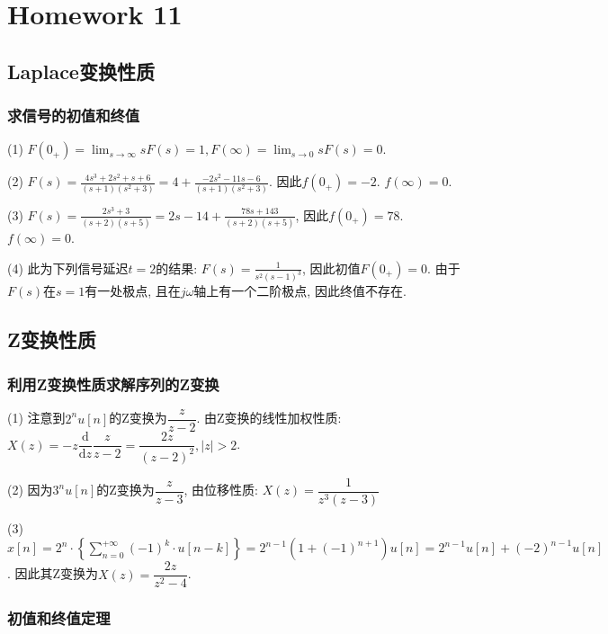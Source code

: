\section{Homework 11}

\subsection{Laplace变换性质}

\subsubsection{求信号的初值和终值}

(1) $F(0_+)=\displaystyle\lim_{s\to\infty}sF(s)=1,F(\infty)=\lim_{s\to0}sF(s)=0$.

(2) $F(s)=\displaystyle\frac{4s^3+2s^2+s+6}{(s+1)(s^2+3)}=4+\frac{-2s^2-11s-6}{(s+1)(s^2+3)}$. 因此$f(0_+)=-2$. $f(\infty)=0$.

(3) $F(s)=\displaystyle\frac{2s^3+3}{(s+2)(s+5)}=2s-14+\frac{78s+143}{(s+2)(s+5)}$, 因此$f(0_+)=78$. $f(\infty)=0$.

(4) 此为下列信号延迟$t=2$的结果: $F(s)=\displaystyle\frac{1}{s^2(s-1)^3}$, 因此初值$F(0_+)=0$. 由于$F(s)$在$s=1$有一处极点, 且在$j\omega$轴上有一个二阶极点, 因此终值不存在.

\subsection{Z变换性质}

\subsubsection{利用Z变换性质求解序列的Z变换}

(1) 注意到$2^nu[n]$的Z变换为$\dfrac{z}{z-2}$. 由Z变换的线性加权性质: $X(z)=-z \dfrac{\mathrm d}{\mathrm dz}\dfrac{z}{z-2}=\dfrac{2z}{(z-2)^2}, |z|>2$.

(2) 因为$3^nu[n]$的Z变换为$\dfrac{z}{z-3}$, 由位移性质: $X(z)=\dfrac{1}{z^3(z-3)}$

(3) $x[n]=2^n\cdot\left\{\displaystyle\sum_{n=0}^{+\infty}(-1)^k\cdot u[n-k]\right\}=2^{n-1}\left(1+(-1)^{n+1}\right)u[n]=2^{n-1}u[n]+(-2)^{n-1}u[n]$. 因此其Z变换为$X(z)=\dfrac{2z}{z^2-4}$.

\subsubsection{初值和终值定理}

